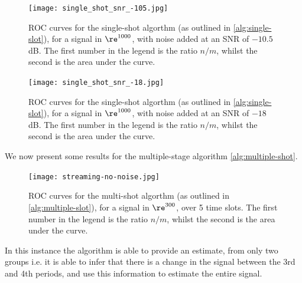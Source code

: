 \begin{figure}[h]
\centering
\texttt{[image: single\_shot\_snr\_-105.jpg]}
\caption{ROC curves for the single-shot algorthm (as outlined in \ref{alg:single-slot}), for a signal in \(\re^{1000}\), with noise added at an SNR of \(-10.5\)dB. The first number in the legend is the ratio \(n/m\), whilst the second is the area under the curve.}
\label{different_k}
\end{figure}

\begin{figure}[h]
\centering
\texttt{[image: single\_shot\_snr\_-18.jpg]}
\caption{ROC curves for the single-shot algorthm (as outlined in \ref{alg:single-slot}), for a signal in \(\re^{1000}\), with noise added at an SNR of \(-18\)dB. The first number in the legend is the ratio \(n/m\), whilst the second is the area under the curve.}
\label{different_k}
\end{figure}

We now present some results for the multiple-stage algorithm \ref{alg:multiple-shot}.

\begin{figure}[h]
\centering
\texttt{[image: streaming-no-noise.jpg]}
\caption{ROC curves for the multi-shot algorthm (as outlined in \ref{alg:multiple-slot}), for a signal in \(\re^{300}\), over 5 time slots. The first number in the legend is the ratio \(n/m\), whilst the second is the area under the curve. }
\label{different_k}
\end{figure}

In this instance the algorithm is able to provide an estimate, from only two groups i.e. it is able to infer that there is a change in the signal between the 3rd and 4th periods, and use this information to estimate the entire signal. 
